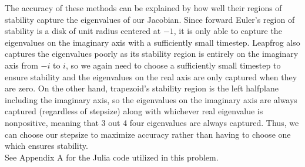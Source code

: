 \documentclass{article}
\begin{document}
The accuracy of these methods can be explained by how well their regions of stability capture the eigenvalues of our Jacobian. Since forward Euler's region of stability is a disk of unit radius centered at $-1$, it is only able to capture the eigenvalues on the imaginary axis with a sufficiently small timestep. Leapfrog also captures the eigenvalues poorly as its stability region is entirely on the imaginary axis from $-i$ to $i$, so we again need to choose a sufficiently small timestep to ensure stability and the eigenvalues on the real axis are only captured when they are zero.  On the other hand, trapezoid's stability region is the left halfplane including the imaginary axis, so the eigenvalues on the imaginary axis are always captured (regardless of stepsize) along with whichever real eigenvalue is nonpositive, meaning that 3 out 4 four eigenvalues are always captured. Thus, we can choose our stepsize to maximize accuracy rather than having to choose one which ensures stability.\\
See Appendix A for the Julia code utilized in this problem. 
\end{document}
